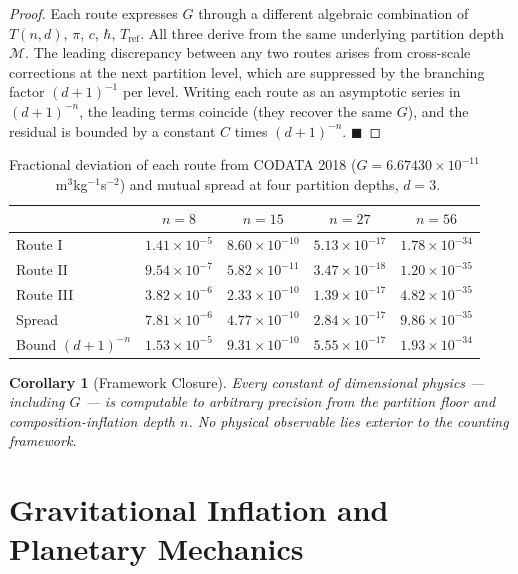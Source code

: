 \documentclass[12pt, a4paper]{article}
\theoremstyle{plain}
\newtheorem{corollary}[theorem]{Corollary}
\theoremstyle{definition}
\theoremstyle{remark}
\newcommand{\qed}{\hfill$\blacksquare$}
\begin{document}
\begin{proof}
Each route expresses $G$ through a different algebraic combination of $T(n,d)$,
$\pi$, $c$, $\hbar$, $T_{\mathrm{ref}}$. All three derive from the same
underlying partition depth $\mathcal{M}$. The leading discrepancy between any
two routes arises from cross-scale corrections at the next partition level, which
are suppressed by the branching factor $(d+1)^{-1}$ per level. Writing each
route as an asymptotic series in $(d+1)^{-n}$, the leading terms coincide
(they recover the same $G$), and the residual is bounded by a constant $C$
times $(d+1)^{-n}$. \qed
\end{proof}

\begin{table}[h]
\centering
\small
\caption{Fractional deviation of each route from CODATA 2018
($G = 6.67430\times 10^{-11}$~m$^3$kg$^{-1}$s$^{-2}$) and mutual spread
at four partition depths, $d = 3$.}
\label{tab:g_routes}
\begin{tabular}{lcccc}
\toprule
 & $n = 8$ & $n = 15$ & $n = 27$ & $n = 56$ \\
\midrule
Route I   & $1.41\times10^{-5}$  & $8.60\times10^{-10}$  & $5.13\times10^{-17}$  & $1.78\times10^{-34}$ \\
Route II  & $9.54\times10^{-7}$  & $5.82\times10^{-11}$  & $3.47\times10^{-18}$  & $1.20\times10^{-35}$ \\
Route III & $3.82\times10^{-6}$  & $2.33\times10^{-10}$  & $1.39\times10^{-17}$  & $4.82\times10^{-35}$ \\
\midrule
Spread    & $7.81\times10^{-6}$  & $4.77\times10^{-10}$  & $2.84\times10^{-17}$  & $9.86\times10^{-35}$ \\
Bound $(d{+}1)^{-n}$ & $1.53\times10^{-5}$ & $9.31\times10^{-10}$ & $5.55\times10^{-17}$ & $1.93\times10^{-34}$ \\
\bottomrule
\end{tabular}
\end{table}

\begin{corollary}[Framework Closure]
\label{cor:closure}
Every constant of dimensional physics --- including $G$ --- is computable to
arbitrary precision from the partition floor and composition-inflation depth
$n$. No physical observable lies exterior to the counting framework.
\end{corollary}

\section{Gravitational Inflation and Planetary Mechanics}
\label{sec:planetary}
\end{document}
